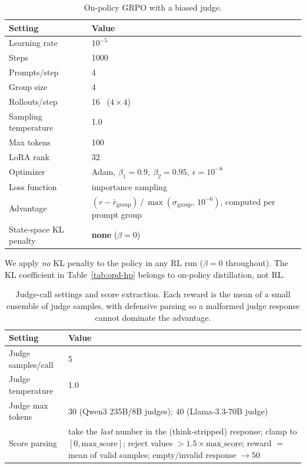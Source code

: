 \documentclass{article}
\begin{document}
\begin{table}[h]
\centering
\caption{On-policy GRPO with a biased judge.}
\begin{tabularx}{\linewidth}{@{}lX@{}}
\toprule
Setting & Value \\
\midrule
Learning rate & $10^{-5}$ \\
\addlinespace
Steps & 1000 \\
\addlinespace
Prompts/step & 4 \\
\addlinespace
Group size & 4 \\
\addlinespace
Rollouts/step & 16 \ ($4\times4$) \\
\addlinespace
Sampling temperature & 1.0 \\
\addlinespace
Max tokens & 100 \\
\addlinespace
LoRA rank & 32 \\
\addlinespace
Optimizer & Adam, $\beta_1{=}0.9,\ \beta_2{=}0.95,\ \epsilon{=}10^{-8}$ \\
\addlinespace
Loss function & importance sampling \\
\addlinespace
Advantage & $(r-\bar r_{\text{group}})\,/\,\max(\sigma_{\text{group}},\,10^{-6})$,
  computed per prompt group \\
\addlinespace
State-space KL penalty & \textbf{none} ($\beta=0$) \\
\bottomrule
\end{tabularx}
\end{table}

We apply \emph{no} KL penalty to the policy in any RL run ($\beta=0$ throughout). The
KL coefficient in Table~\ref{tab:opd-hp} belongs to on-policy distillation, not RL.

\begin{table}[h]
\centering
\caption{Judge-call settings and score extraction. Each
reward is the mean of a small ensemble of judge samples, with defensive parsing so a
malformed judge response cannot dominate the advantage.}
\begin{tabularx}{\linewidth}{@{}lX@{}}
\toprule
Setting & Value \\
\midrule
Judge samples/call & 5 \\
\addlinespace
Judge temperature & 1.0 \\
\addlinespace
Judge max tokens & 30 (Qwen3 235B/8B judges); 40 (Llama-3.3-70B judge) \\
\addlinespace
Score parsing & take the \emph{last} number in the (think-stripped) response;
  clamp to $[0,\text{max\_score}]$; reject values $>1.5\times\text{max\_score}$;
  reward $=$ mean of valid samples; empty/invalid response $\to 50$ \\
\bottomrule
\end{tabularx}
\end{table}
\end{document}
